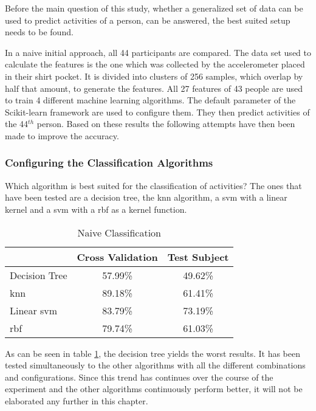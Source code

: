 Before the main question of this study, whether a generalized set of data can be used to predict activities of a person, can be answered, the best suited setup needs to be found.

In a naive initial approach, all 44 participants are compared. The data set used to calculate the features is the one which was collected by the accelerometer placed in their shirt pocket. It is divided into clusters of 256 samples, which overlap by half that amount, to generate the features. All 27 features of 43 people are used to train 4 different machine learning algorithms. The default parameter of the Scikit-learn framework are used to configure them. They then predict activities of the 44$^{th}$ person. Based on these results the following attempts have then been made to improve the accuracy.


\subsubsection{Configuring the Classification Algorithms}
\label{config:algorithm}
Which algorithm is best suited for the classification of activities? The ones that have been tested are a decision tree, the \gls{knn} algorithm, a \gls{svm} with a linear kernel and a \gls{svm} with a \gls{rbf} as a kernel function.

\begin{table}[!htb]
    \centering
    \begin{tabular}{@{}lcc@{}}
        \toprule
         & Cross Validation & Test Subject \\
        \midrule
        Decision Tree & 57.99\% & 49.62\% \\
        \gls{knn} & 89.18\% & 61.41\% \\
        Linear \gls{svm} & 83.79\% & 73.19\% \\
        \gls{rbf} & 79.74\% & 61.03\% \\
        \bottomrule
    \end{tabular}
    \caption{Naive Classification}
    \label{table:naive}
\end{table}

As can be seen in table \ref{table:naive}, the decision tree yields the worst results. It has been tested simultaneously to the other algorithms with all the different combinations and configurations. Since this trend has continues over the course of the experiment and the other algorithms continuously perform better, it will not be elaborated any further in this chapter.

